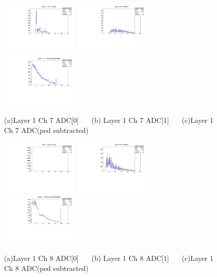 \documentclass[a4paper,11pt]{article}
\theoremstyle{mytheor}
\begin{document}
\begin{figure}[H] 
\vspace*{-0.3cm} 
\includegraphics[width=0.33\textwidth,scale=0.5,trim=0 0 0 0,clip]{plotsdir/file0_test-Layer1_Ch7_adc0-1.pdf} 
\includegraphics[width=0.33\textwidth,scale=0.5,trim=0 0 0 0,clip]{plotsdir/file0_test-Layer1_Ch7_adc1-1.pdf} 
\includegraphics[width=0.33\textwidth,scale=0.5,trim=0 0 0 0,clip]{plotsdir/file0_test-Layer1_Ch7_adcPedsub-1.pdf} 
\caption{(a)Layer 1 Ch 7 ADC[0] ~~~(b) Layer 1 Ch 7 ADC[1] ~~~(c)Layer 1 Ch 7 ADC(ped subtracted) } 
\end{figure} 
\begin{figure}[H] 
\vspace*{-0.3cm} 
\includegraphics[width=0.33\textwidth,scale=0.5,trim=0 0 0 0,clip]{plotsdir/file0_test-Layer1_Ch8_adc0-1.pdf} 
\includegraphics[width=0.33\textwidth,scale=0.5,trim=0 0 0 0,clip]{plotsdir/file0_test-Layer1_Ch8_adc1-1.pdf} 
\includegraphics[width=0.33\textwidth,scale=0.5,trim=0 0 0 0,clip]{plotsdir/file0_test-Layer1_Ch8_adcPedsub-1.pdf} 
\caption{(a)Layer 1 Ch 8 ADC[0] ~~~(b) Layer 1 Ch 8 ADC[1] ~~~(c)Layer 1 Ch 8 ADC(ped subtracted) } 
\end{figure} 
\end{document}

